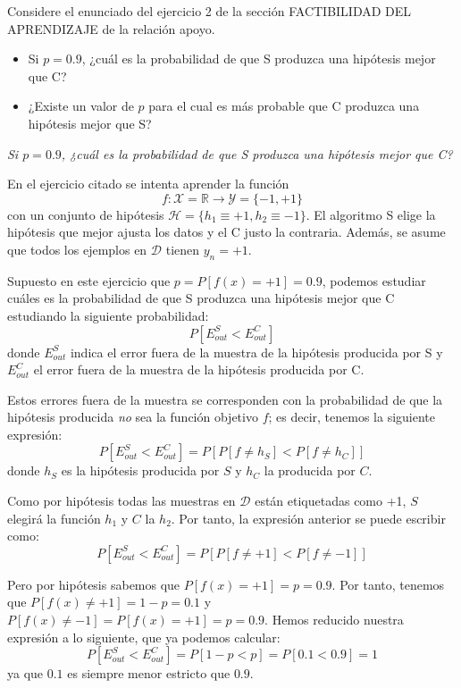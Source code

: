 \documentclass[a4paper, 11pt]{article}
\begin{document}
    \begin{ejercicio}
        Considere el enunciado del ejercicio 2 de la sección FACTIBILIDAD DEL APRENDIZAJE de la relación apoyo.
        \begin{itemize}
            \item Si $p = 0.9$, ¿cuál es la probabilidad de que S produzca una hipótesis mejor que C?
            \item ¿Existe un valor de $p$ para el cual es más probable que C produzca una hipótesis mejor que S?
        \end{itemize}
    \end{ejercicio}

    \begin{solucion}
        \emph{Si $p = 0.9$, ¿cuál es la probabilidad de que S produzca una hipótesis mejor que C?}

        En el ejercicio citado se intenta aprender la función
        \[
            f \colon \mathcal{X} = \mathbb{R} \to \mathcal{Y} = \{-1, +1\}
        \]
        con un conjunto de hipótesis $\mathcal{H} = \{h_1 \equiv +1, h_2 \equiv -1 \}$. El algoritmo S elige la hipótesis que mejor ajusta los datos y el C justo la contraria. Además, se asume que todos los ejemplos en $\mathcal{D}$ tienen $y_n = +1$.

        Supuesto en este ejercicio que $p = P[f(x) = +1] = 0.9$, podemos estudiar cuáles es la probabilidad de que S produzca una hipótesis mejor que C estudiando la siguiente probabilidad:
        \[
            P[E_{out}^S < E_{out}^C]
        \]
        donde $E_{out}^S$ indica el error fuera de la muestra de la hipótesis producida por S y $E_{out}^C$ el error fuera de la muestra de la hipótesis producida por C.

        Estos errores fuera de la muestra se corresponden con la probabilidad de que la hipótesis producida \emph{no} sea la función objetivo $f$; es decir, tenemos la siguiente expresión:
        \[
            P[E_{out}^S < E_{out}^C] = P[ P[f \neq h_S] < P[f \neq h_C] ]
        \]
        donde $h_S$ es la hipótesis producida por $S$ y $h_C$ la producida por $C$.

        Como por hipótesis todas las muestras en $\mathcal{D}$ están etiquetadas como +1, $S$ elegirá la función $h_1$ y $C$ la $h_2$. Por tanto, la expresión anterior se puede escribir como:
        \[
            P[E_{out}^S < E_{out}^C] = P[ P[f \neq +1] < P[f \neq -1] ]
        \]

        Pero por hipótesis sabemos que $P[f(x) = +1] = p = 0.9$. Por tanto, tenemos que $P[f(x) \neq +1] = 1 - p = 0.1$ y $P[f(x) \neq -1] = P[f(x) = +1] = p = 0.9$. Hemos reducido nuestra expresión a lo siguiente, que ya podemos calcular:
        \begin{equation}
            P[E_{out}^S < E_{out}^C] = P[1-p < p] = P[ 0.1 < 0.9 ] = 1
            \label{eq:prob}
        \end{equation}
        ya que $0.1$ es siempre menor estricto que $0.9$.


\end{solucion}
\end{document}
